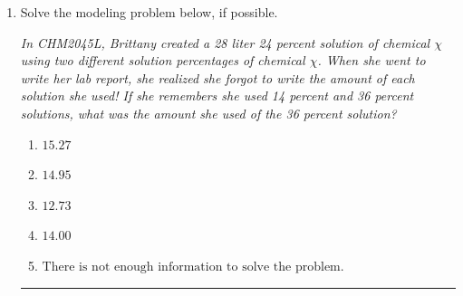 \documentclass[14pt]{extbook}
\newcommand{\litem}[1]{\item#1\hspace*{-1cm}\rule{\textwidth}{0.4pt}}
\begin{document}
\begin{enumerate}
{\begin{enumerate}[label=\Alph*.]
\end{enumerate} }
\litem{
Solve the modeling problem below, if possible.
\begin{center}
    \textit{ In CHM2045L, Brittany created a 28 liter 24 percent solution of chemical $\chi$ using two different solution percentages of chemical $\chi$. When she went to write her lab report, she realized she forgot to write the amount of each solution she used! If she remembers she used 14 percent and 36 percent solutions, what was the amount she used of the 36 percent solution? }
\end{center}
\begin{enumerate}[label=\Alph*.]
\item \( 15.27 \)
\item \( 14.95 \)
\item \( 12.73 \)
\item \( 14.00 \)
\item \( \text{There is not enough information to solve the problem.} \)

\end{enumerate} }
\end{enumerate}
\end{document}

